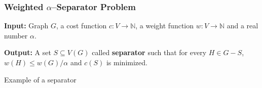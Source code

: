 \documentclass{beamer}
\newcommand{\br}[1]{\mathopen{}\left( #1 \right)}
\begin{document}
\begin{frame}
\frametitle{Weighted $\alpha$–Separator Problem}
\begin{tcolorbox}[colback=white, title=Weighted $\alpha$–Separator Problem, fonttitle=\bfseries, breakable]
\textbf{Input:} Graph $G$, a cost function $c\colon V\to \mathbb{N}$, a weight function $w\colon V\to \mathbb{N}$ and a real number $\alpha$.

\pause
\textbf{Output:} A set $S\subseteq V\br{G}$ called \textbf{separator} such that for every $H\in G-S$, $w\br{H}\leq w\br{G}/\alpha$ and $c\br{S}$ is minimized.
\end{tcolorbox}

\end{frame}

\begin{frame}{Example of a separator}
    
\end{frame}
\end{document}
